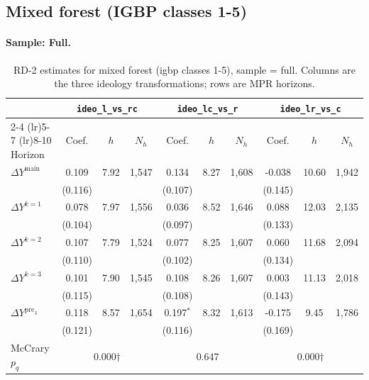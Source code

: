\documentclass[11pt]{article}
\begin{document}
\clearpage
\subsection{Mixed forest (IGBP classes 1-5)}
\paragraph{Sample: Full.}
\begin{table}[H]
\centering
\scriptsize
\caption{RD-2 estimates for mixed forest (igbp classes 1-5), sample = full.
Columns are the three ideology transformations; rows are MPR horizons.}
\label{tab:rd2_mixed_forest_all}
\begin{tabular}{l ccc ccc ccc}
\toprule
 & \multicolumn{3}{c}{\texttt{ideo\_l\_vs\_rc}}
 & \multicolumn{3}{c}{\texttt{ideo\_lc\_vs\_r}}
 & \multicolumn{3}{c}{\texttt{ideo\_lr\_vs\_c}} \\
\cmidrule(lr){2-4} \cmidrule(lr){5-7} \cmidrule(lr){8-10}
Horizon & Coef. & $h$ & $N_h$ & Coef. & $h$ & $N_h$ & Coef. & $h$ & $N_h$ \\
\midrule
$\Delta Y^{\text{main}}$ & 0.109 & 7.92 & 1,547 & 0.134 & 8.27 & 1,608 & -0.038 & 10.60 & 1,942 \\
 & (0.116) &  &  & (0.107) &  &  & (0.145) &  &  \\
\addlinespace[1pt]
$\Delta Y^{k=1}$ & 0.078 & 7.97 & 1,556 & 0.036 & 8.52 & 1,646 & 0.088 & 12.03 & 2,135 \\
 & (0.104) &  &  & (0.097) &  &  & (0.133) &  &  \\
\addlinespace[1pt]
$\Delta Y^{k=2}$ & 0.107 & 7.79 & 1,524 & 0.077 & 8.25 & 1,607 & 0.060 & 11.68 & 2,094 \\
 & (0.110) &  &  & (0.102) &  &  & (0.134) &  &  \\
\addlinespace[1pt]
$\Delta Y^{k=3}$ & 0.101 & 7.90 & 1,545 & 0.108 & 8.26 & 1,607 & 0.003 & 11.13 & 2,018 \\
 & (0.115) &  &  & (0.108) &  &  & (0.143) &  &  \\
\addlinespace[1pt]
$\Delta Y^{\text{pre}_3}$ & 0.118 & 8.57 & 1,654 & 0.197$^{*}$ & 8.32 & 1,613 & -0.175 & 9.45 & 1,786 \\
 & (0.121) &  &  & (0.116) &  &  & (0.169) &  &  \\
\addlinespace[1pt]
\midrule
McCrary $p_q$ & \multicolumn{3}{c}{0.000$\dagger$} & \multicolumn{3}{c}{0.647} & \multicolumn{3}{c}{0.000$\dagger$} \\
\bottomrule
\end{tabular}
\end{table}
\end{document}
